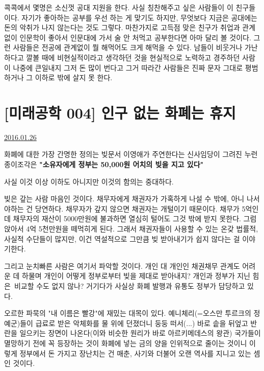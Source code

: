 콕콕에서 몇명은 소신껏 공대 지원을 한다. 사실 칭찬해주고 싶은 사람들이 이 친구들이다.
자기가 좋아하는 공부를 우선 하는 게 맞기도 하지만, 무엇보다 지금은 공대에는 돈의 악취가 나지 않는다는 것도 그렇다.
마찬가지로 고득점 맞은 친구가 취업과 관계없이 인문학이 좋아서 인문대에 가서 술 안 처먹고 공부한다면 아마 달리 볼 것이다.
그런 사람들은 전공에 관계없이 뭘 해먹어도 크게 해먹을 수 있다.
남들이 비웃거나 가난하다고 깔볼 때에 비현실적이라고 생각하던 것을 현실적으로 노력하고 경주하던 사람이 나중에 큰일내지
그저 돈 많이 번다고 그거 따라간 사람들은 진짜 문자 그대로 평범하거나 그 이하로 밖에 살지 못 한다.
\vspace{5mm}





\section{[미래공학 004] 인구 없는 화폐는 휴지}
\href{https://www.kockoc.com/Apoc/609990}{2016.01.26}

\vspace{5mm}

화폐에 대한 가장 간명한 정의는 빚문서
이영애가 주연한다는 신사임당이 그려진 누런 종이조각은
\textbf{"소유자에게 정부는 50,000원 어치의 빚을 지고 있다"}
\vspace{5mm}

사실 이것 이상 이하도 아니지만
이것의 함의는 중대하다.
\vspace{5mm}

빚은 갚는 사람 마음인 것이다.
채무자에게 채권자가 가혹하게 나설 수 밖에, 아니 나서야하는 건 당연하다.
채무자가 갚지 않으면 채권자는 개털이기 때문이다.
채무가 5억인데 채무자의 재산이 5000만원에 불과하면 열심히 털어도 그것 밖에 받지 못한다.
그럼 앉아서 4억 5천만원을 떼먹히게 된다.
그래서 채권자들이 사용할 수 있는 온갖 법률적, 사실적 수단들이 많지만,
이건 역설적으로 그만큼 빚 받아내기가 쉽지 않다는 걸 이야기한다.
\vspace{5mm}

그리고 눈치빠른 사람은 여기서 파악할 것이다.
개인 대 개인인 채권채무 관계도 어려운 데
하물며 개인이 어떻게 정부로부터 빚을 제대로 받아내지?
개인과 정부가 지닌 힘은 비교할 수도 없지 않나?
거기다가 사실상 화폐 발행과 유통도 정부가 담당하고 있다.
\vspace{5mm}

오르한 파묵의 "내 이름은 빨강"에 재밌는 대목이 있다.
예니체리(=오스만 투르크의 정예군)들이 급료로 받은 악체화를 물 위에 던졌더니 둥둥 떠서(...)
바로 솥을 뒤엎고 반란을 일으키는 장면이 나온다(이와 비슷한 원리가 바로 아르키메데스의 왕관)
국가들이 멸망하기 전에 꼭 등장하는 것이
화폐에 넣는 금의 양을 인위적으로 줄이는 것이니 이렇게
정부에서 돈 가지고 장난치는 건 매춘, 사기와 더불어 오랜 역사를 지니고 있는 셈인 것이다.
\vspace{5mm}

